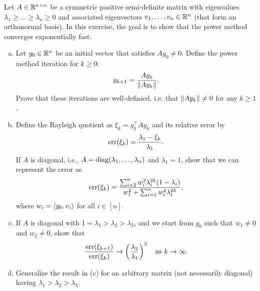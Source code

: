\begin{myexercise}\label{prob:power_method}
    Let $A \in \mathbb{R}^{n\times n}$ be a symmetric positive semi-definite matrix with eigenvalues $\lambda_1 \geq \ldots \geq \lambda_n \geq 0$ and associated eigenvectors $v_1, \ldots, v_n \in \mathbb{R}^n$ (that form an orthonormal basis). In this exercise, the goal is to show that the power method converges exponentially fast.
    
    \begin{enumerate}[(a)]
        \item Let $y_0 \in \mathbb{R}^n$ be an initial vector that satisfies $A y_0 \neq 0$. Define the power method iteration for $k \geq 0$: 
        \begin{equation*}
            y_{k+1} = \frac{A y_k}{{\left\lVert{A y_k}\right\rVert}}.
        \end{equation*}
        Prove that these iterations are well-definied, i.e. that ${\left\lVert{A y_k}\right\rVert} \neq 0$ for any $k \geq 1$.
        
        \item Define the Rayleigh quotient as $\xi_k = y_k^\top A y_k$ and its relative error by 
        \begin{equation*}
            \operatorname{err}(\xi_k) = \frac{ \lambda_1 - \xi_k}{\lambda_1}.
        \end{equation*}
        If $A$ is diagonal, i.e., $A = \operatorname{diag}(\lambda_1, \dots, \lambda_n)$ and $\lambda_1 = 1$, show that we can represent the error as
        \begin{equation*}
            \operatorname{err}(\xi_k) = \frac{\sum_{i=2}^n w_i^2 \lambda_i^{2k} (1 - \lambda_i)}{w_1^2 + \sum_{i=2}^n w_i^2 \lambda_i^{2k}},
        \end{equation*}
        where $w_i = \left\langle y_0, v_i \right\rangle$ for all $i \in [n]$.

        \item If $A$ is diagonal with $1 = \lambda_1 > \lambda_2 > \lambda_3$, and we start from $y_0$ such that $w_1 \neq 0$ and $w_2 \neq 0$, show that
        \begin{equation*}
            \frac{\operatorname{err}(\xi_{k+1})}{\operatorname{err}(\xi_k)} \to \left( \frac{\lambda_2}{\lambda_1} \right)^{2} \quad \text{as $k\to \infty$}.
        \end{equation*}
        
        \item Generalize the result in (c) for an arbitrary matrix (not necessarily diagonal) having $\lambda_1 > \lambda_2 > \lambda_3$.
    \end{enumerate}
\end{myexercise}

